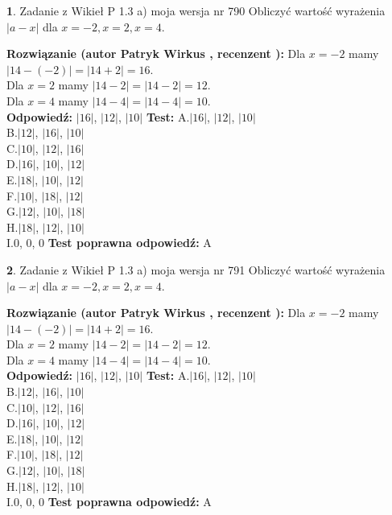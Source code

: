 \documentclass[12pt, a4paper]{article}
\theoremstyle{definition} %
\newtheorem{zad}{}
\newcommand{\zadStart}[1]{\begin{zad}#1\newline}
\newcommand{\zadStop}{\end{zad}}
\newcommand{\rozwStart}[2]{\noindent \textbf{Rozwiązanie (autor #1 , recenzent #2): }\newline}
\newcommand{\rozwStop}{\newline}
\newcommand{\odpStart}{\noindent \textbf{Odpowiedź:}\newline}
\newcommand{\odpStop}{\newline}
\newcommand{\testStart}{\noindent \textbf{Test:}\newline}
\newcommand{\testStop}{\newline}
\newcommand{\kluczStart}{\noindent \textbf{Test poprawna odpowiedź:}\newline}
\newcommand{\kluczStop}{\newline}
\begin{document}
\zadStart{Zadanie z Wikieł P 1.3 a) moja wersja nr 790}
Obliczyć wartość wyrażenia $|a - x|$ dla $x=-2,x=2,x=4$.
\zadStop
\rozwStart{Patryk Wirkus}{}
Dla $x = -2$ mamy $|14 - (-2)| = |14 + 2| = 16$.\\
Dla $x = 2$ mamy $|14 - 2| = |14 - 2| = 12$.\\
Dla $x = 4$ mamy $|14 - 4| = |14 - 4| = 10$.\\
\rozwStop
\odpStart
$|16|$, $|12|$, $|10|$
\odpStop
\testStart
A.$|16|$, $|12|$, $|10|$\\
B.$|12|$, $|16|$, $|10|$\\
C.$|10|$, $|12|$, $|16|$\\
D.$|16|$, $|10|$, $|12|$\\
E.$|18|$, $|10|$, $|12|$\\
F.$|10|$, $|18|$, $|12|$\\
G.$|12|$, $|10|$, $|18|$\\
H.$|18|$, $|12|$, $|10|$\\
I.$0$, $0$, $0$
\testStop
\kluczStart
A
\kluczStop



\zadStart{Zadanie z Wikieł P 1.3 a) moja wersja nr 791}
Obliczyć wartość wyrażenia $|a - x|$ dla $x=-2,x=2,x=4$.
\zadStop
\rozwStart{Patryk Wirkus}{}
Dla $x = -2$ mamy $|14 - (-2)| = |14 + 2| = 16$.\\
Dla $x = 2$ mamy $|14 - 2| = |14 - 2| = 12$.\\
Dla $x = 4$ mamy $|14 - 4| = |14 - 4| = 10$.\\
\rozwStop
\odpStart
$|16|$, $|12|$, $|10|$
\odpStop
\testStart
A.$|16|$, $|12|$, $|10|$\\
B.$|12|$, $|16|$, $|10|$\\
C.$|10|$, $|12|$, $|16|$\\
D.$|16|$, $|10|$, $|12|$\\
E.$|18|$, $|10|$, $|12|$\\
F.$|10|$, $|18|$, $|12|$\\
G.$|12|$, $|10|$, $|18|$\\
H.$|18|$, $|12|$, $|10|$\\
I.$0$, $0$, $0$
\testStop
\kluczStart
A
\kluczStop
\end{document}
